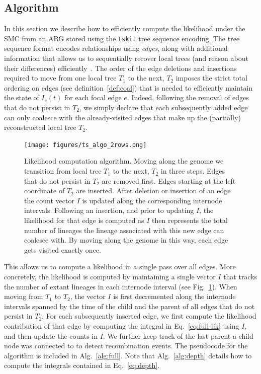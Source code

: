 \documentclass{article}
\begin{document}
\setcounter{table}{0}
\setcounter{figure}{0}
\renewcommand{\thetable}{A\arabic{table}}
\renewcommand{\thefigure}{A\arabic{figure}}

\subsection*{Algorithm} \label{par:algo}
In this section we describe how to efficiently compute the likelihood under the SMC
from an ARG stored using the \texttt{tskit} tree sequence encoding.
The tree sequence format encodes relationships using \emph{edges},
along with additional information that
allows us to sequentially recover local trees (and reason about their differences) 
efficiently~\citep{kelleher_efficient_2016, ralph_efficiently_2020}.
The order of the edge deletions and insertions required to move from one local tree $T_1$ to
the next, $T_2$ imposes the strict total ordering on edges
(see definition~\eqref{def:coal})
that is needed to efficiently maintain the state of $I_e(t)$ for each focal edge $e$.
Indeed, following the removal of edges that do not persist in $T_2$,
we simply declare that each subsequently added edge
can only coalesce with the already-visited edges
that make up the (partially) reconstructed local tree $T_2$.

\begin{figure}[!ht]
\centering
\texttt{[image: figures/ts\_algo\_2rows.png]}
\caption{Likelihood computation algorithm.
Moving along the genome we transition from
local tree $T_1$ to the next, $T_2$ in three steps.
Edges that do not persist in $T_2$ are
removed first. Edges starting at the left coordinate of $T_2$ are inserted.
After deletion or insertion of an edge the count vector $I$ is updated along the
corresponding internode intervals. Following an insertion, and prior to updating $I$,
the likelihood for that edge is computed as $I$ then represents the total number of
lineages the lineage associated with this new edge can
coalesce with. By moving along the genome in this way, each edge gets visited exactly once.}
\label{fig:algo}
\end{figure}

This allows us to compute a likelihood in a single pass over all edges.
More concretely, the likelihood is computed by maintaining a single vector $I$ that tracks
the number of extant lineages in each internode interval (see Fig.~\ref{fig:algo}).
When moving from $T_1$ to $T_2$, the vector $I$ is first decremented along
the internode intervals
spanned by the time of the child and the parent of all edges that do not persist in $T_2$.
For each subsequently inserted edge, we first compute the likelihood contribution
of that edge by computing the integral
in Eq.~\eqref{eq:full-lik} using $I$, and then update the counts in $I$.
We further keep track of
the last parent a child node was connected to to detect recombination events.
The pseudocode for the algorithm is included in Alg.~\ref{alg:full}. Note that Alg.~\ref{alg:depth} 
details how to compute the integrals contained in Eq.~\eqref{eq:depth}. 
\end{document}
